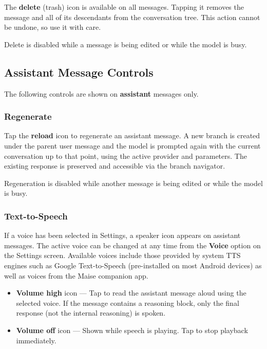 \documentclass[12pt,a4paper]{article}
\begin{document}
The \textbf{delete} (trash) icon is available on all messages. Tapping it removes the message and all of its descendants from the conversation tree. This action cannot be undone, so use it with care.

Delete is disabled while a message is being edited or while the model is busy.

\subsection{Assistant Message Controls}

The following controls are shown on \textbf{assistant} messages only.

\subsubsection{Regenerate}

Tap the \textbf{reload} icon to regenerate an assistant message. A new branch is created under the parent user message and the model is prompted again with the current conversation up to that point, using the active provider and parameters. The existing response is preserved and accessible via the branch navigator.

Regeneration is disabled while another message is being edited or while the model is busy.

\subsubsection{Text-to-Speech}

If a voice has been selected in Settings, a speaker icon appears on assistant messages. The active voice can be changed at any time from the \textbf{Voice} option on the Settings screen. Available voices include those provided by system TTS engines such as Google Text-to-Speech (pre-installed on most Android devices) as well as voices from the Maise companion app.

\begin{itemize}[noitemsep]
    \item \textbf{Volume high} icon — Tap to read the assistant message aloud using the selected voice. If the message contains a reasoning block, only the final response (not the internal reasoning) is spoken.
    \item \textbf{Volume off} icon — Shown while speech is playing. Tap to stop playback immediately.
\end{itemize}
\end{document}

